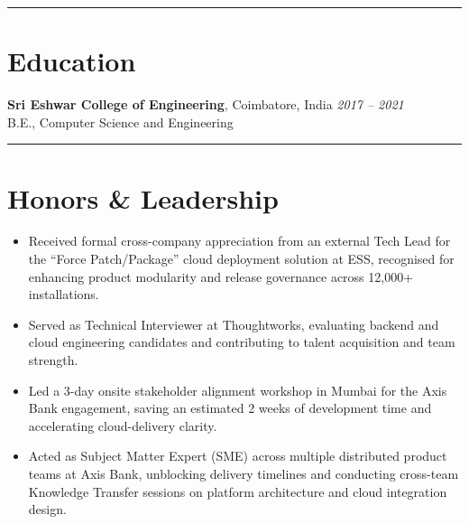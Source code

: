\documentclass[a4paper,10pt]{article}
\newcommand{\sectionline}{\vspace{-0.1em}\noindent\rule{\linewidth}{0.6pt}\vspace{-0.7em}}
\begin{document}
\sectionline
\section*{Education}
\textbf{Sri Eshwar College of Engineering}, Coimbatore, India \hfill \textit{2017 -- 2021}\\
B.E., Computer Science and Engineering

\sectionline
\section*{Honors \& Leadership}
\begin{itemize}[leftmargin=1.5em, itemsep=0.01em]
  \item Received formal cross-company appreciation from an external Tech Lead for the ``Force Patch/Package'' cloud deployment solution at ESS, recognised for enhancing product modularity and release governance across 12,000+ installations.
  \item Served as Technical Interviewer at Thoughtworks, evaluating backend and cloud engineering candidates and contributing to talent acquisition and team strength.
  \item Led a 3-day onsite stakeholder alignment workshop in Mumbai for the Axis Bank engagement, saving an estimated 2 weeks of development time and accelerating cloud-delivery clarity.
  \item Acted as Subject Matter Expert (SME) across multiple distributed product teams at Axis Bank, unblocking delivery timelines and conducting cross-team Knowledge Transfer sessions on platform architecture and cloud integration design.
\end{itemize}
\end{document}
